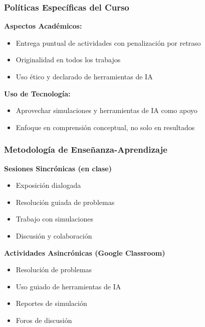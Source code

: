 \documentclass{beamer}
\begin{document}
\begin{frame}
	\frametitle{Políticas Específicas del Curso}
	
	\textbf{Aspectos Académicos:}
	
	\begin{itemize}
		\item Entrega puntual de actividades con penalización por retraso
		\item Originalidad en todos los trabajos
		\item Uso ético y declarado de herramientas de IA
	\end{itemize}

	\textbf{Uso de Tecnología:}
	
	\begin{itemize}
		\item Aprovechar simulaciones y herramientas de IA como apoyo
		\item Enfoque en comprensión conceptual, no solo en resultados
	\end{itemize}
	
\end{frame}





\begin{frame}
    \frametitle{Metodología de Enseñanza-Aprendizaje}
    
    \textbf{Sesiones Sincrónicas (en clase)}
    \begin{itemize}
        \item Exposición dialogada
        \item Resolución guiada de problemas
        \item Trabajo con simulaciones
        \item Discusión y colaboración
    \end{itemize}
    \vspace{0.3cm}
    
    \textbf{Actividades Asincrónicas (Google Classroom)}
    \begin{itemize}
        \item Resolución de problemas
        \item Uso guiado de herramientas de IA
        \item Reportes de simulación
        \item Foros de discusión
    \end{itemize}
\end{frame}
\end{document}
